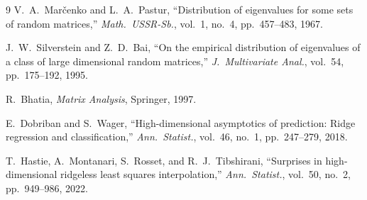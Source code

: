 \documentclass[11pt,a4paper]{article}
\theoremstyle{definition}
\begin{document}
\begin{thebibliography}{9}
V.~A.~Mar\v{c}enko and L.~A.~Pastur,
``Distribution of eigenvalues for some sets of random matrices,''
\emph{Math.\ USSR-Sb.}, vol.~1, no.~4, pp.~457--483, 1967.

J.~W.~Silverstein and Z.~D.~Bai,
``On the empirical distribution of eigenvalues of a class of large
dimensional random matrices,''
\emph{J.\ Multivariate Anal.}, vol.~54, pp.~175--192, 1995.

R.~Bhatia,
\emph{Matrix Analysis},
Springer, 1997.

E.~Dobriban and S.~Wager,
``High-dimensional asymptotics of prediction: Ridge regression and
classification,''
\emph{Ann.\ Statist.}, vol.~46, no.~1, pp.~247--279, 2018.

T.~Hastie, A.~Montanari, S.~Rosset, and R.~J.~Tibshirani,
``Surprises in high-dimensional ridgeless least squares interpolation,''
\emph{Ann.\ Statist.}, vol.~50, no.~2, pp.~949--986, 2022.
\end{thebibliography}
\end{document}

